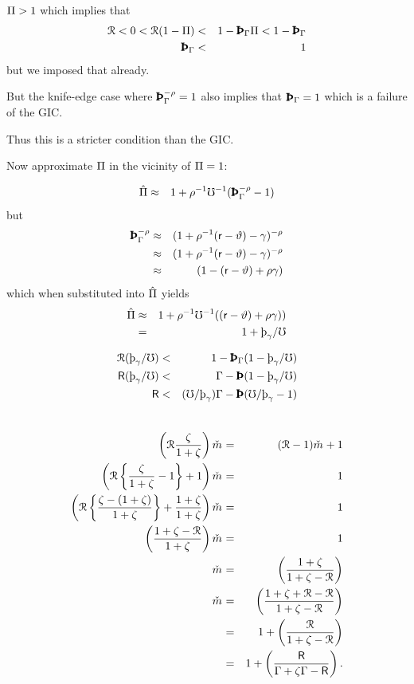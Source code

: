 \documentclass{handout}
\begin{document}
$\Pi > 1$ which implies that 
\begin{eqnarray}
  \Rnorm < 0 < \Rnorm(1-\straight) & < & 1 - \PatPGro  \straight < 1 - \PatPGro
\\  \PatPGro & < & 1 
\end{eqnarray}
but we imposed that already.

But the knife-edge case where $\PatPGro^{-\CRRA} = 1$ also implies that $\PatPGro = 1$ which is a failure of the GIC.

Thus this is a stricter condition than the GIC.

Now approximate $\Pi$ in the vicinity of $\Pi=1$:

\begin{eqnarray}
  \label{eq:HatPi}
  \hat{\straight} & \approx & 1 + \CRRA^{-1} \urate^{-1} (\PatPGro^{-\CRRA}-1)
\end{eqnarray}
but 
\begin{eqnarray}
  \label{eq:HatPi}
  \PatPGro^{-\CRRA} & \approx & (1+\CRRA^{-1}(\rfree-\timeRate)-\pGro)^{-\CRRA}
\\ & \approx & (1+\CRRA^{-1}(\rfree-\timeRate)-\pGro)^{-\CRRA}
\\ & \approx & (1-(\rfree-\timeRate)+\CRRA\pGro)
\end{eqnarray}
which when substituted into $\hat{\Pi}$ yields
\begin{eqnarray}
  \label{eq:HatPi}
  \hat{\straight} & \approx & 1 + \CRRA^{-1} \urate^{-1} ((\rfree-\timeRate)+\CRRA\pGro))
\\ & = & 1 + \patpGro/\urate
\end{eqnarray}

\begin{eqnarray}
  \Rnorm (\patpGro/\urate) & < & 1- \PatPGro(1-\patpGro/\urate)
\\  \Rfree (\patpGro/\urate) & < & \PGro - \Pat(1-\patpGro/\urate)
\\  \Rfree  & < & (\urate/\patpGro) \PGro - \Pat(\urate/\patpGro-1)
\end{eqnarray}

\begin{eqnarray}
\\  \left(\Rnorm\frac{\zeta}{1+\zeta}\right)\mTarg^{\null} & = & (\Rnorm-1)\mTarg^{\null}+1
\\  \left(\Rnorm\left\{\frac{\zeta}{1+\zeta}-1\right\}+1\right)\mTarg^{\null} & = & 1
\\  \left(\Rnorm\left\{\frac{\zeta-(1+\zeta)}{1+\zeta}\right\}+\frac{1+\zeta}{1+\zeta}\right)\mTarg^{\null} & = & 1
\\  \left(\frac{1+\zeta-\Rnorm}{1+\zeta}\right)\mTarg^{\null} & = & 1
\\  \mTarg^{\null} & = & \left(\frac{1+\zeta}{1+\zeta-\Rnorm}\right)
\\  \mTarg^{\null} & = & \left(\frac{1+\zeta+\Rnorm-\Rnorm}{1+\zeta-\Rnorm}\right)
\\ & = & 1 + \left(\frac{\Rnorm}{1+\zeta-\Rnorm}\right)
\\ & = & 1 + \left(\frac{\Rfree}{\PGro+\zeta\PGro-\Rfree}\right)  \label{eq:mTarget}
.
\end{eqnarray}
\end{document}
